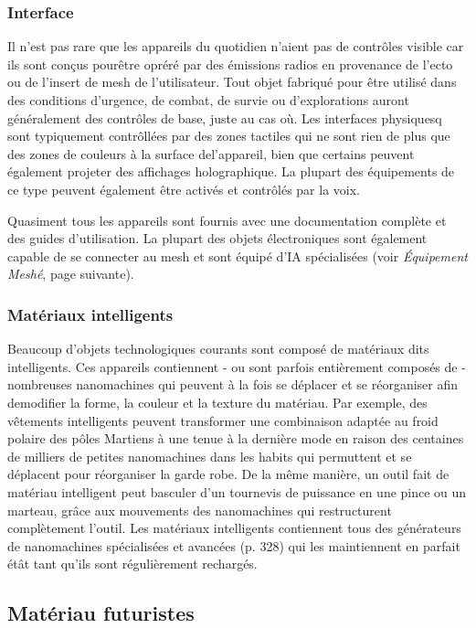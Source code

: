 \subsubsection{Interface} 

Il n'est pas rare que les appareils du quotidien n'aient pas de contrôles visible car ils sont conçus pourêtre opréré par des émissions radios en provenance de l'ecto ou de l'insert de mesh de l'utilisateur. Tout objet fabriqué pour être utilisé dans des conditions d'urgence, de combat, de survie ou d'explorations auront généralement des contrôles de base, juste au cas où. Les interfaces physiquesq sont typiquement contrôllées par des zones tactiles qui ne sont rien de plus que des zones de couleurs à la surface del'appareil, bien que certains peuvent également projeter des affichages holographique. La plupart des équipements de ce type peuvent également être activés et contrôlés par la voix. 

Quasiment tous les appareils sont fournis avec une documentation complète et des guides d'utilisation. La plupart des objets électroniques sont également capable de se connecter au mesh et sont équipé d'IA spécialisées (voir \emph{Équipement Meshé}, page suivante). 

\subsubsection{Matériaux intelligents} 

Beaucoup d'objets technologiques courants sont composé de matériaux dits intelligents. Ces appareils contiennent - ou sont parfois entièrement composés de - nombreuses nanomachines qui peuvent à la fois se déplacer et se réorganiser afin demodifier la forme, la couleur et la texture du matériau. Par exemple, des vêtements intelligents peuvent transformer une combinaison adaptée au froid polaire des pôles Martiens à une tenue à la dernière mode en raison des centaines de milliers de petites nanomachines dans les habits qui permuttent et se déplacent pour réorganiser la garde robe. De la même manière, un outil fait de matériau intelligent peut basculer d'un tournevis de puissance en une pince ou un marteau, grâce aux mouvements des nanomachines qui restructurent complètement l'outil. Les matériaux intelligents contiennent tous des générateurs de nanomachines spécialisées et avancées (p. 328) qui les maintiennent en parfait étât tant qu'ils sont régulièrement rechargés. 

\subsection{Matériau futuristes} \label{sec:future-materials} 

